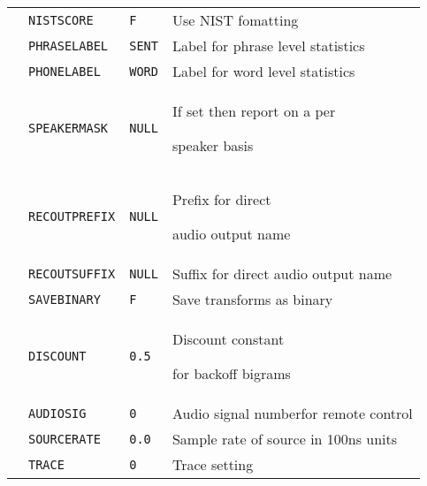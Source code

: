 \begin{center}
\begin{supertabular}{|p{1.8cm}|l|l|p{6.6cm}|}
  & \texttt{NISTSCORE} & \texttt{F} & Use NIST fomatting \\ 


  & \texttt{PHRASELABEL} & \texttt{SENT} & Label for phrase level statistics \\ 


  & \texttt{PHONELABEL} & \texttt{WORD} & Label for word level statistics \\ 


  & \texttt{SPEAKERMASK} & \texttt{NULL} & If set then report on a per


  speaker basis \\ \hline 







  & \texttt{RECOUTPREFIX} & \texttt{NULL} & Prefix for direct


  audio output name \\ 


 & \texttt{RECOUTSUFFIX} & \texttt{NULL} & Suffix for direct audio output name\\ 


  & \texttt{SAVEBINARY} & \texttt{F} & Save transforms as binary \\ \hline







 & \texttt{DISCOUNT} & \texttt{0.5} & Discount constant


  for backoff bigrams\\ \hline









  & \texttt{AUDIOSIG} & \texttt{0} & Audio signal numberfor remote control 


  \\ 


  & \texttt{SOURCERATE} & \texttt{0.0} & Sample rate of source in 100ns units 


  \\ \hline







  & \texttt{TRACE} & \texttt{0} & Trace setting\\ \hline






\end{supertabular}
\end{center}
